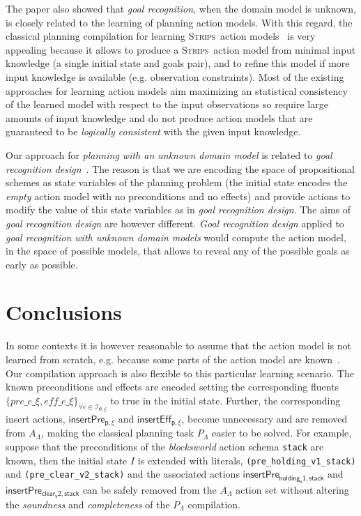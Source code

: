 \documentclass{article}
\newcommand{\strips}{\textsc{Strips}}
\begin{document}
The paper also showed that {\em goal recognition}, when the domain model is unknown, is closely related to the learning of planning action models. With this regard, the classical planning compilation for learning \strips\ action models~\cite{aineto2018learning} is very appealing because it allows to produce a \strips\ action model from minimal input knowledge (a single initial state and goals pair), and to refine this model if more input knowledge is available (e.g. observation constraints). Most of the existing approaches for learning action models aim maximizing an statistical consistency of the learned model with respect to the input observations so require large amounts of input knowledge and do not produce action models that are guaranteed to be {\em logically consistent} with the given input knowledge.

Our approach for {\em planning with an unknown domain model} is related to {\em goal recognition design}~\cite{KerenGK14}. The reason is that we are encoding the space of propositional schemes as state variables of the planning problem (the initial state encodes the {\em empty} action model with no preconditions and no effects) and provide actions to modify the value of this state variables as in {\em goal recognition design}. The aims of {\em goal recognition design} are however different. {\em Goal recognition design} applied to {\em goal recognition with unknown domain models} would compute the action model, in the space of possible models, that allows to reveal any of the possible goals as early as possible.



\section{Conclusions}
\label{sec:conclusions}
In some contexts it is however reasonable to assume that the action model is not learned from scratch, e.g. because some parts of the action model are known~\cite{ZhuoNK13,sreedharan2018handling,pereira2018heuristic}. Our compilation approach is also flexible to this particular learning scenario. The known preconditions and effects are encoded setting the corresponding fluents $\{pre\_e\_\xi, eff\_e\_\xi\}_{\forall e\in{\mathcal I}_{\Psi,\xi}}$ to true in the initial state. Further, the corresponding insert actions, $\mathsf{insertPre_{p,\xi}}$ and $\mathsf{insertEff_{p,\xi}}$, become unnecessary and are removed from $A_{\Lambda}$, making the classical planning task $P_{\Lambda}$ easier to be solved. For example, suppose that the preconditions of the {\em blocksworld} action schema {\tt stack} are known, then the initial state $I$ is extended with literals, {\small\tt(pre\_holding\_v1\_stack)} and {\small\tt(pre\_clear\_v2\_stack)} and the associated actions $\mathsf{insertPre_{holding_v1,stack}}$ and $\mathsf{insertPre_{clear_v2,stack}}$ can be safely removed from the $A_{\Lambda}$ action set without altering the {\em soundness} and {\em completeness} of the $P_{\Lambda}$ compilation.



\end{document}
